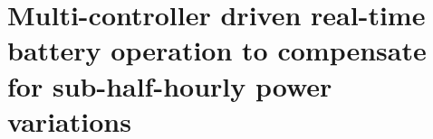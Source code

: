 \chapter{Multi-controller driven real-time battery operation to compensate for sub-half-hourly power variations}
\label{ch2}

